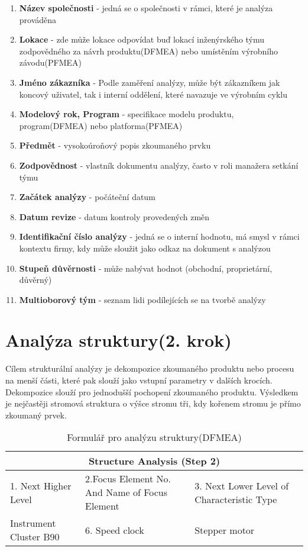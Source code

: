 \begin{enumerate}
	\item \textbf{Název společnosti} - jedná se o společnosti v rámci, které je analýza prováděna
	\item \textbf{Lokace} - zde může lokace odpovídat buď lokací inženýrského týmu zodpovědného za návrh produktu(DFMEA) nebo umístěním výrobního závodu(PFMEA) 
	\item \textbf{Jméno zákazníka} - Podle zaměření analýzy, může být zákazníkem jak koncový uživatel, tak i interní oddělení, které navazuje ve výrobním cyklu
 \item \textbf{Modelový rok, Program} - specifikace modelu produktu, program(DFMEA) nebo platforma(PFMEA)
 \item \textbf{Předmět} - vysokoúroňový popis zkoumaného prvku
 \item \textbf{Zodpovědnost} - vlastník dokumentu analýzy, často v roli manažera setkání týmu
 \item \textbf{Začátek analýzy} - počáteční datum
 \item \textbf{Datum revize} - datum kontroly provedených změn 
 \item \textbf{Identifikační číslo analýzy} - jedná se o interní hodnotu, má smysl v rámci kontextu firmy, kdy může sloužit jako odkaz na dokument s analýzou
 \item \textbf{Stupeň důvěrnosti} - může nabývat hodnot (obchodní, proprietární, důvěrný)
 \item \textbf{Multioborový tým} - seznam lidi podílejících se na tvorbě analýzy
\end{enumerate}

\section{Analýza struktury(2. krok)}
\label{sec:FMEA_postup_2}
Cílem strukturální analýzy je dekompozice zkoumaného produktu nebo procesu na menší části, které pak slouží jako vstupní parametry v dalších krocích. Dekompozice slouží pro jednodušší pochopení zkoumaného produktu. Výsledkem je nejčastěji stromová struktura o výšce stromu tři, kdy kořenem stromu je přímo zkoumaný prvek.





\begin{center}
\begin{table}[h]
	\centering
	\caption{Formulář pro analýzu struktury(DFMEA) }
	\label{tab:structure_DFMEA}
\begin{tabular}{ |p{4cm}|p{3cm}|p{3cm}|  }
 \hline
 \multicolumn{3}{|c|}{Structure Analysis (Step 2)} \\
 \hline
 1. Next Higher Level& 2.Focus Element
No. And Name of Focus Element &3. Next Lower Level of Characteristic Type\\
 \hline
 Instrument Cluster B90   & 6. Speed clock    &Stepper motor\\


 \hline
\end{tabular}\  
\end{table}
\end{center}

